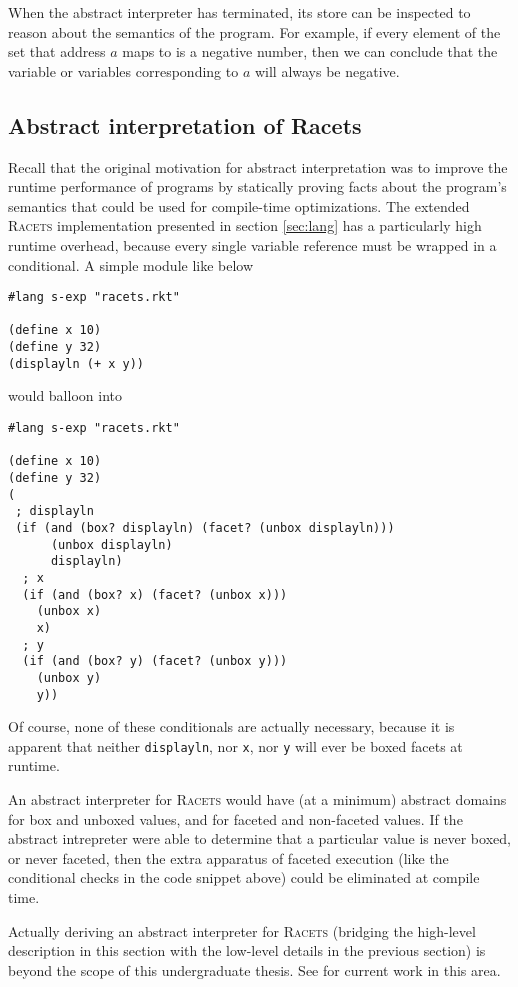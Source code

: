 \documentclass{article}
\begin{document}
When the abstract interpreter has terminated, its store can be inspected to reason about the semantics of the program. For example, if every element of the set that address $a$ maps to is a negative number, then we can conclude that the variable or variables corresponding to $a$ will always be negative.


\subsection{Abstract interpretation of Racets}
Recall that the original motivation for abstract interpretation was to improve the runtime performance of programs by statically proving facts about the program's semantics that could be used for compile-time optimizations. The extended \textsc{Racets} implementation presented in section \ref{sec:lang} has a particularly high runtime overhead, because every single variable reference must be wrapped in a conditional. A simple module like below

\begin{lstlisting}
#lang s-exp "racets.rkt"

(define x 10)
(define y 32)
(displayln (+ x y))
\end{lstlisting}

\noindent would balloon into

\begin{lstlisting}
#lang s-exp "racets.rkt"

(define x 10)
(define y 32)
(
 ; displayln
 (if (and (box? displayln) (facet? (unbox displayln)))
      (unbox displayln)
      displayln)
  ; x
  (if (and (box? x) (facet? (unbox x)))
    (unbox x)
    x)
  ; y
  (if (and (box? y) (facet? (unbox y)))
    (unbox y)
    y))
\end{lstlisting}

Of course, none of these conditionals are actually necessary, because it is apparent that neither \texttt{displayln}, nor \texttt{x}, nor \texttt{y} will ever be boxed facets at runtime.

An abstract interpreter for \textsc{Racets} would have (at a minimum) abstract domains for box and unboxed values, and for faceted and non-faceted values. If the abstract intrepreter were able to determine that a particular value is never boxed, or never faceted, then the extra apparatus of faceted execution (like the conditional checks in the code snippet above) could be eliminated at compile time.

Actually deriving an abstract interpreter for \textsc{Racets} (bridging the high-level description in this section with the low-level details in the previous section) is beyond the scope of this undergraduate thesis. See \cite{abstract-inter} for current work in this area.
\end{document}
